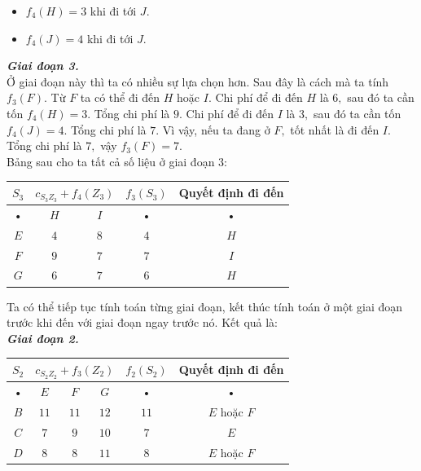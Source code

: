 \documentclass[12pt,a4paper]{article}
\begin{document}
\begin{itemize}
\item \({f_4}\left( H \right) = 3\) khi đi tới \(J.\)
\item \({f_4}\left( J \right) = 4\) khi đi tới \(J.\)
\end{itemize}
\textbf{\textit{Giai đoạn 3.}}\\
Ở giai đoạn này thì ta có nhiều sự lựa chọn hơn. Sau đây là cách mà ta tính \({f_3}\left( F \right).\) Từ \(F\) ta có thể đi đến \(H\) hoặc \(I.\) Chi phí để đi đến \(H\) là \(6,\) sau đó ta cần tốn \({f_4}\left( H \right) = 3.\) Tổng chi phí là \(9.\) Chi phí để đi đến \(I\) là \(3,\) sau đó ta cần tốn \({f_4}\left( J \right) = 4.\) Tổng chi phí là \(7.\) Vì vậy, nếu ta đang ở \(F,\) tốt nhất là đi đến \(I.\) Tổng chi phí là \(7,\) vậy \({f_3}\left( F \right) = 7.\)\\
Bảng sau cho ta tất cả số liệu ở giai đoạn 3:
\begin{center}
\begin{table}[H]
\begin{tabular}{|c|c|c|c|c|}
\hline 
\(S_3\) & \multicolumn{2}{c|}{\({c_{{S_3}{Z_3}}} + {f_4}\left( {{Z_3}} \right)\)} & \({f_3}\left( {{S_3}} \right)\) & Quyết định đi đến \\ 
\hline 
• & \(H\) & \(I\) & • & • \\ 
\hline 
\(E\) & \(4\) & \(8\) & \(4\) & \(H\) \\ 
\hline 
\(F\) & \(9\)  & \(7\) & \(7\)  & \(I\) \\ 
\hline 
\(G\) & \(6\) & \(7\) & \(6\) & \(H\) \\ 
\hline 
\end{tabular}
\end{table}
\end{center} 
Ta có thể tiếp tục tính toán từng giai đoạn, kết thúc tính toán ở một giai đoạn trước khi đến với giai đoạn ngay trước nó. Kết quả là:\\
\textbf{\textit{Giai đoạn 2.}}
\begin{center}
\begin{table}[H]
\begin{tabular}{|c|c|c|c|c|c|}
\hline 
\(S_2\) & \multicolumn{3}{c|}{\({c_{{S_2}{Z_2}}} + {f_3}\left( {{Z_2}} \right)\)} & \({f_2}\left( {{S_2}} \right)\) & Quyết định đi đến \\ 
\hline 
• & \(E\) & \(F\) & \(G\) & • & • \\ 
\hline 
\(B\) & \(11\) & \(11\) & \(12\) & \(11\) & \(E\) hoặc \(F\) \\ 
\hline 
\(C\) & \(7\) & \(9\) & \(10\) & \(7\) & \(E\) \\ 
\hline 
\(D\) & \(8\) & \(8\) & \(11\) & \(8\) & \(E\) hoặc \(F\) \\ 
\hline 
\end{tabular}
\end{table}
\end{center} 
\end{document}
